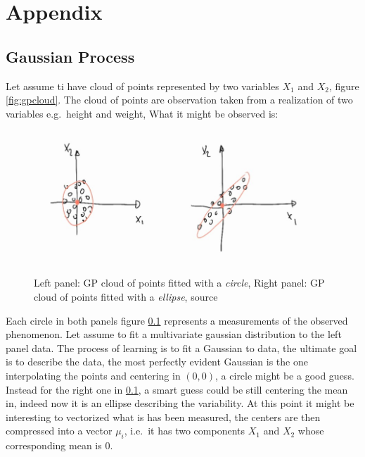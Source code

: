 \documentclass[
  12pt,
  a4paper,
  oneside]{book}
\theoremstyle{definition}
\theoremstyle{definition}
\theoremstyle{definition}
\theoremstyle{remark}
\begin{document}
\hypertarget{appendix}{%
\chapter*{Appendix}\label{appendix}}

\hypertarget{gpbasics}{%
\section{Gaussian Process}\label{gpbasics}}

Let assume ti have cloud of points represented by two variables \(X_1\) and \(X_2\), figure \ref{fig:gpcloud}. The cloud of points are observation taken from a realization of two variables e.g.~height and weight, What it might be observed is:

\begin{figure}
\centering
\includegraphics{appendix_images/gp_base_1.jpg}
\caption{\label{fig:gpclouds}Left panel: GP cloud of points fitted with a \emph{circle}, Right panel: GP cloud of points fitted with a \emph{ellipse}, source \citet{YT:freitas1}}
\end{figure}

Each circle in both panels figure \ref{fig:gpclouds} represents a measurements of the observed phenomenon. Let assume to fit a multivariate gaussian distribution to the left panel data. The process of learning is to fit a Gaussian to data, the ultimate goal is to describe the data, the most perfectly evident Gaussian is the one interpolating the points and centering in \(\left(0,0\right)\), a circle might be a good guess. Instead for the right one in \ref{fig:gpclouds}, a smart guess could be still centering the mean in, indeed now it is an ellipse describing the variability.
At this point it might be interesting to vectorized what is has been measured, the centers are then compressed into a vector \(\mu_{i}\), i.e.~it has two components \(X_1\) and \(X_2\) whose corresponding mean is 0.
\end{document}
